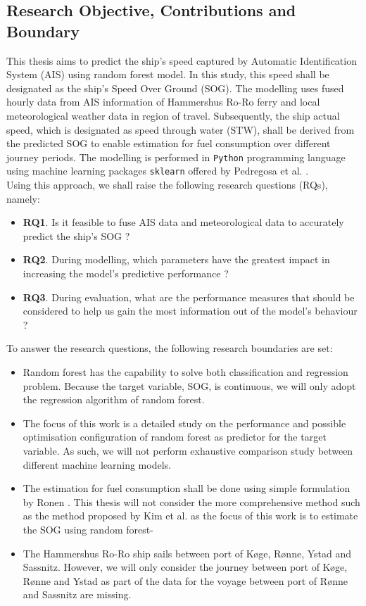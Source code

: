 \subsection{Research Objective, Contributions and Boundary}\label{objectives}

This thesis aims to predict the ship's speed captured by Automatic Identification System (AIS) using random forest model. In this study, this speed shall be designated as the ship's Speed Over Ground (SOG). The modelling uses fused hourly data from AIS information of Hammershus Ro-Ro ferry and local meteorological weather data in region of travel. Subsequently, the ship actual speed, which is designated as speed through water (STW), shall be derived from the predicted SOG to enable estimation for fuel consumption over different journey periods. The modelling is performed in {\tt Python} programming language using machine learning packages {\tt sklearn} offered by Pedregosa et al. \cite{FabianPedregosa.2011}. \\

Using this approach, we shall raise the following research questions (RQs), namely:

\begin{itemize}
    \item \textbf{RQ1}. Is it feasible to fuse AIS data and meteorological data to accurately predict the ship's SOG ?
    \item \textbf{RQ2}. During modelling, which parameters have the greatest impact in increasing the model's predictive performance ?
    \item \textbf{RQ3}. During evaluation, what are the performance measures that should be considered to help us gain the most information out of the model's behaviour ?
\end{itemize} 

To answer the research questions, the following research boundaries are set:

\begin{itemize}
    \item Random forest has the capability to solve both classification and regression problem. Because the target variable, SOG, is continuous, we will only adopt the regression algorithm of random forest.
    \item The focus of this work is a detailed study on the performance and possible optimisation configuration of random forest as predictor for the target variable. As such, we will not perform exhaustive comparison study between different machine learning models.
    \item The estimation for fuel consumption shall be done using simple formulation by Ronen \cite{Ronen.1982,Ronen.2011}. This thesis will not consider the more comprehensive method such as the method proposed by Kim et al. \cite{Kim.2020} as the focus of this work is to estimate the SOG using random forest-
    \item The Hammershus Ro-Ro ship sails between port of K{\o}ge, R{\o}nne, Ystad and Sassnitz. However, we will only consider the journey between port of K{\o}ge, R{\o}nne and Ystad as part of the data for the voyage between port of R{\o}nne and Sassnitz are missing. 
\end{itemize}

